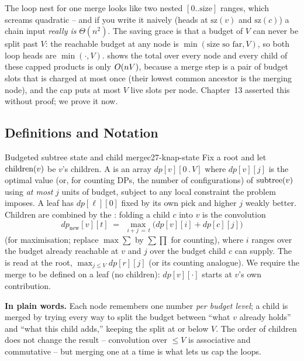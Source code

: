 The loop nest for one merge looks like two nested $[0..\text{size}]$ ranges,
which screams quadratic -- and if you write it naively (heads at $\text{sz}(v)$
and $\text{sz}(c)$) a chain input \emph{really is} $\Theta(n^2)$. The saving
grace is that a budget of $V$ can never be split past $V$: the reachable
budget at any node is $\min(\text{size so far}, V)$, so both loop heads are
$\min(\cdot, V)$.  shows the total over every node and
every child of these capped products is only $O(nV)$, because a merge step
is a pair of budget slots that is charged at most once (their lowest common
ancestor is the merging node), and the cap puts at most $V$ live slots per
node. Chapter~13 asserted this without proof; we prove it now.

\subsection{Definitions and Notation}

\begin{definition}{Budgeted subtree state and child merge}{c27-knap-state}
Fix a root and let $\operatorname{children}(v)$ be $v$'s children. A  is an array $\mathit{dp}[v][0\,.\,V]$ where $\mathit{dp}[v][j]$ is the
optimal value (or, for counting DPs, the number of configurations) of
$\operatorname{subtree}(v)$ using \emph{at most} $j$ units of budget, subject to any local
constraint the problem imposes. A leaf has $\mathit{dp}[\ell][0]$ fixed by its
own pick and higher $j$ weakly better. Children are combined by the
: folding a child $c$ into $v$ is the convolution
\[
  \mathit{dp}_{\text{new}}[v][t] \;=\; \max_{\,i+j\,=\,t}\Big(\mathit{dp}[v][i] + \mathit{dp}[c][j]\Big)
\]
(for maximisation; replace $\max\!\sum$ by $\sum\!\prod$ for counting), where
$i$ ranges over the budget already reachable at $v$ and $j$ over the budget
child $c$ can supply. The  is read at the root, $\max_{j\le V}\mathit{dp}[r][j]$
(or its counting analogue). We require the merge to be defined on a leaf
(no children): $\mathit{dp}[v][\cdot]$ starts at $v$'s own contribution.
\end{definition}

\noindent\textbf{In plain words.} Each node remembers one number \emph{per
budget level}; a child is merged by trying every way to split the budget
between ``what $v$ already holds'' and ``what this child adds,'' keeping the
split at or below $V$. The order of children does not change the result --
convolution over $\le V$ is associative and commutative -- but merging one at
a time is what lets us cap the loops.

